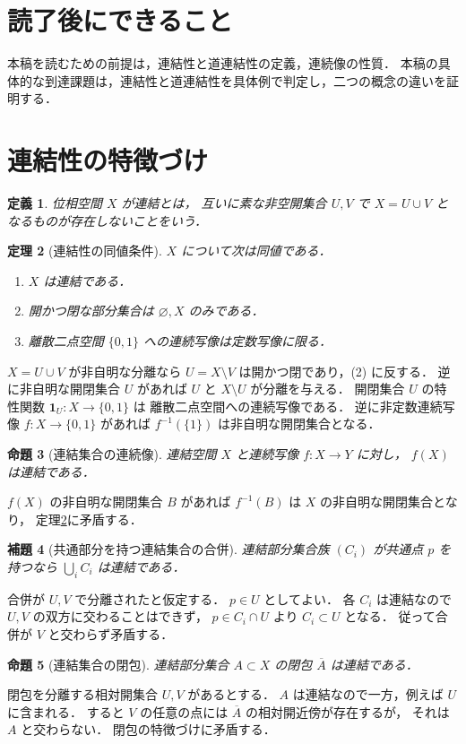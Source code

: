 \documentclass[a5paper,10pt,onecolumn]{jsarticle}
\makeatletter
\theoremstyle{mathnotetheorem}
\newtheorem{theorem}{定理}[section]
\newtheorem{definition}[theorem]{定義}
\newtheorem{lemma}[theorem]{補題}
\newtheorem{proposition}[theorem]{命題}
\renewcommand{\proofname}{証明}
\renewenvironment{proof}[1][\proofname]{%
  \par\pushQED{\qed}\normalfont\topsep4\p@\@plus2\p@\relax
  \trivlist\item[\hskip\labelsep\bfseries #1]\ignorespaces
}{\popQED\endtrivlist\@endpefalse}
\makeatother
\begin{document}
\section*{読了後にできること}
本稿を読むための前提は，連結性と道連結性の定義，連続像の性質．
本稿の具体的な到達課題は，連結性と道連結性を具体例で判定し，二つの概念の違いを証明する．


\section{連結性の特徴づけ}
\begin{definition}
位相空間 $X$ が連結とは，
互いに素な非空開集合 $U,V$ で $X=U\cup V$
となるものが存在しないことをいう．
\end{definition}
\begin{theorem}[連結性の同値条件]\label{thm:connected}
$X$ について次は同値である．
\begin{enumerate}
\item $X$ は連結である．
\item 開かつ閉な部分集合は $\varnothing,X$ のみである．
\item 離散二点空間 $\{0,1\}$ への連続写像は定数写像に限る．
\end{enumerate}
\end{theorem}
\begin{proof}
$X=U\cup V$ が非自明な分離なら
$U=X\setminus V$ は開かつ閉であり，(2) に反する．
逆に非自明な開閉集合 $U$ があれば
$U$ と $X\setminus U$ が分離を与える．
開閉集合 $U$ の特性関数 $\mathbf1_U:X\to\{0,1\}$ は
離散二点空間への連続写像である．
逆に非定数連続写像 $f:X\to\{0,1\}$ があれば
$f^{-1}(\{1\})$ は非自明な開閉集合となる．
\end{proof}
\begin{proposition}[連結集合の連続像]
連結空間 $X$ と連続写像 $f:X\to Y$ に対し，
$f(X)$ は連結である．
\end{proposition}
\begin{proof}
$f(X)$ の非自明な開閉集合 $B$ があれば
$f^{-1}(B)$ は $X$ の非自明な開閉集合となり，
定理\ref{thm:connected}に矛盾する．
\end{proof}
\begin{lemma}[共通部分を持つ連結集合の合併]\label{lem:union}
連結部分集合族 $(C_i)$ が共通点 $p$ を持つなら
$\bigcup_iC_i$ は連結である．
\end{lemma}
\begin{proof}
合併が $U,V$ で分離されたと仮定する．
$p\in U$ としてよい．
各 $C_i$ は連結なので $U,V$ の双方に交わることはできず，
$p\in C_i\cap U$ より $C_i\subset U$ となる．
従って合併が $V$ と交わらず矛盾する．
\end{proof}
\begin{proposition}[連結集合の閉包]
連結部分集合 $A\subset X$ の閉包 $\overline A$ は連結である．
\end{proposition}
\begin{proof}
閉包を分離する相対開集合 $U,V$ があるとする．
$A$ は連結なので一方，例えば $U$ に含まれる．
すると $V$ の任意の点には $\overline A$ の相対開近傍が存在するが，
それは $A$ と交わらない．
閉包の特徴づけに矛盾する．
\end{proof}
\end{document}
